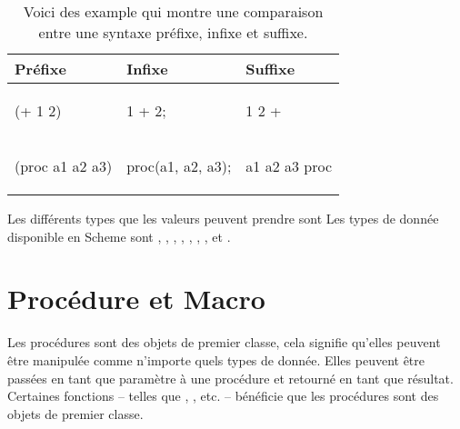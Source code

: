 \begin{table}[htbp]
\begin{center}
\begin{tabular}{|l|l|l|}
  \hline
  \textbf{Préfixe}& \textbf{Infixe}& \textbf{Suffixe}\\\hline
  \begin{mplisting}{0.1}
(+ 1 2)
\end{mplisting}&
  \begin{mplisting}{0.1}
1 + 2;
\end{mplisting}&
  \begin{mplisting}{0.1}
1 2 +
\end{mplisting}\\
\hline
  \begin{mplisting}{0.22}
(proc a1 a2 a3)
\end{mplisting}&
  \begin{mplisting}{0.22}
proc(a1, a2, a3);
\end{mplisting}&
  \begin{mplisting}{0.22}
a1 a2 a3 proc
\end{mplisting}\\
\hline
\end{tabular}
\end{center}
  \caption{Voici des example qui montre une comparaison entre une syntaxe préfixe, infixe et suffixe.}
  \label{tab:prefix_vs_infix}
\end{table}


Les différents types que les valeurs peuvent prendre sont Les types de donnée
disponible en Scheme sont , , ,
, , , ,
 et .

\section{Procédure et Macro}
\label{sec:proc_and_macro}

Les procédures sont des objets de premier classe, cela signifie qu'elles
peuvent être manipulée comme n'importe quels types de donnée. Elles peuvent
être passées en tant que paramètre à une procédure et retourné en tant que
résultat.  Certaines fonctions -- telles que , , etc.
-- bénéficie que les procédures sont des objets de premier classe.

